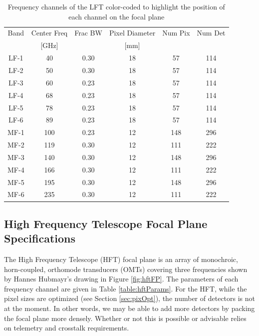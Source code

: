 \documentclass[12pt, titlepage]{article} %
\begin{document}
\begin{table}[H]
\centering
	\begin{tabu}{|| c | c | c | c | c | c ||}
	\hline
	Band & Center Freq & Frac BW & Pixel Diameter & Num Pix & Num Det \\
	 &  [GHz] & & [mm] & & \\
	\hline \hline
	\rowfont{\color{red}}
		LF-1 & 40 & 0.30 & 18 & 57 & 114 \\
	\hline
	\rowfont{\color{orange}}
		LF-2 & 50 & 0.30 & 18 & 57 & 114 \\
	\hline
	\rowfont{\color{Red}}	
		LF-3 & 60	 & 0.23 & 18 & 57 & 114 \\
	\hline
	\rowfont{\color{Orange}}
		LF-4 & 68 	& 0.23 & 18 & 57 & 114 \\
	\hline
	\rowfont{\color{Red}}
		LF-5 & 78	 & 0.23 & 18 & 57 & 114 \\
	\hline
	\rowfont{\color{Orange}}
		LF-6 & 89 & 0.23 & 18 & 57 & 114 \\
	\hline
	\rowfont{\color{Blue}}
		MF-1 & 100 & 0.23 & 12 & 148 & 296 \\
	\hline	
	\rowfont{\color{Green}}
		MF-2 & 119 & 0.30 & 12 & 111 & 222 \\
	\hline
	\rowfont{\color{Blue}}
		MF-3 & 140 & 0.30 & 12 & 148 & 296 \\
	\hline
	\rowfont{\color{Green}}	
		MF-4 & 166 & 0.30 & 12 & 111 & 222 \\
	\hline
	\rowfont{\color{Blue}}	
		MF-5 & 195 & 0.30 & 12 & 148 & 296 \\
	\hline
	\rowfont{\color{Green}}
		MF-6 & 235 & 0.30 & 12 & 111 & 222 \\
	\hline
	\end{tabu}
\caption{Frequency channels of the LFT color-coded to highlight the position of each channel on the focal plane \label{table:lftParams}}
\end{table}


\subsection{High Frequency Telescope Focal Plane Specifications}

The High Frequency Telescope (HFT) focal plane is an array of monochroic, horn-coupled, orthomode transducers (OMTs) covering three frequencies shown by Hannes Hubmayr's drawing in Figure \ref{fig:hftFP}. The parameters of each frequency channel are given in Table \ref{table:hftParams}. For the HFT, while the pixel sizes are optimized (see Section \ref{sec:pixOpt}), the number of detectors is not at the moment. In other words, we may be able to add more detectors by packing the focal plane more densely. Whether or not this is possible or advisable relies on telemetry and crosstalk requirements.
\end{document}
